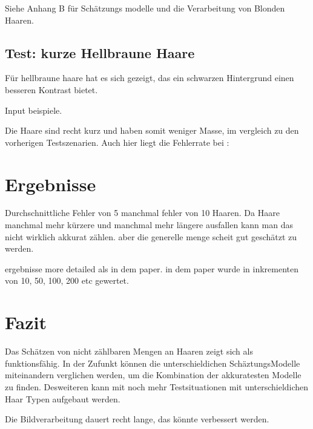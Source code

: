 \documentclass[german,a4paper, 12pt]{scrartcl}
\begin{document}
Siehe Anhang B für Schätzungs modelle und die Verarbeitung von Blonden Haaren.

\subsection{Test: kurze Hellbraune Haare}

Für hellbraune haare hat es sich gezeigt, das ein schwarzen Hintergrund einen besseren Kontrast bietet.

Input beispiele.

Die Haare sind recht kurz und haben somit weniger Masse, im vergleich zu den vorherigen Testszenarien. Auch hier liegt die Fehlerrate bei :  


\section{Ergebnisse}
Durchschnittliche Fehler von 5 manchmal fehler von 10 Haaren. 
Da Haare manchmal mehr kürzere und manchmal mehr längere ausfallen kann man das nicht wirklich akkurat zählen. aber die generelle menge scheit gut geschätzt zu werden. 

ergebnisse more detailed als in dem paper. in dem paper wurde in inkrementen von 10, 50, 100, 200 etc gewertet. 

\section{Fazit}
Das Schätzen von nicht zählbaren Mengen an Haaren zeigt sich als funktionsfähig. In der Zufunkt können die unterschieldichen SchäztungsModelle miteinandern verglichen werden, um die Kombination der akkuratesten Modelle zu finden. 
Desweiteren kann mit noch mehr Testsituationen mit unterschieldichen Haar Typen aufgebaut werden. 

Die Bildverarbeitung dauert recht lange, das könnte verbessert werden. 

\end{document}
